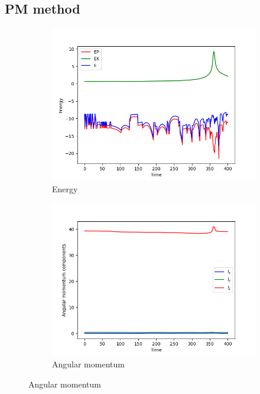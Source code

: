 \subsection{PM method}
\begin{figure}[H]
    \centering
    \begin{subfigure}[b]{0.5\textwidth}
        \centering
        \includegraphics[width=\textwidth]{chapters/results/img/pm-collision/energy.png}
        \caption{Energy}
        \label{fig:physical-quantities-pm-collision-sub1}
    \end{subfigure}

    \vspace{0.2cm}

    \begin{subfigure}[b]{0.5\textwidth}
        \centering
        \includegraphics[width=\textwidth]{chapters/results/img/pm-collision/angular-momentum.png}
        \caption{Angular momentum}
        \label{fig:physical-quantities-pm-collision-sub2}
    \end{subfigure}


\end{figure}
